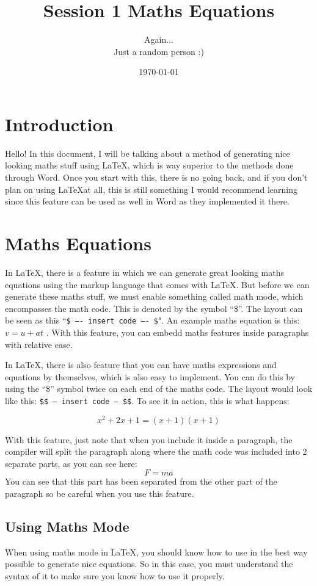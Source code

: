 \documentclass[12pt, a4paper]{article}
\title{Session 1 Maths Equations}
\author{Again... \\ Just a random person :)}
\date{\today}
\begin{document}
	\maketitle

	\section{Introduction}
		Hello! In this document, I will be talking about a method of generating nice looking maths stuff using \LaTeX , which is way superior to the methods done through Word.
		Once you start with this, there is no going back, and if you don't plan on using \LaTeX at all, this is still something I would recommend learning since this feature
		can be used as well in Word as they implemented it there.

	\section{Maths Equations}
		In \LaTeX , there is a feature in which we can generate great looking maths equations using the markup language that comes with \LaTeX .
		But before we can generate these maths stuff, we must enable something called math mode, which encompasses the math code. This is denoted by the symbol ``\$''.
		The layout can be seen as this ``\texttt{\$ ---- insert code ---- \$}". An example maths equation is this: $ v = u + at $ . With this feature, you can
		embedd maths features inside paragraphs with relative ease.

		In \LaTeX , there is also feature that you can have maths expressions and equations by themselves, which is also easy to implement. You can do this
		by using the ``\$'' symbol twice on each end of the maths code. The layout would look like this:
		\texttt{\$\$ -- insert code -- \$\$}. To see it in action, this is what happens:

		$$x^2 + 2x + 1 = (x+1)(x+1)$$

		With this feature, just note that when you include it inside a paragraph, the compiler will split the paragraph along
		where the math code was included into 2 separate parts, as you can see here:
		$$F = ma$$
		You can see that this part has been separated from the other part of the paragraph so be careful when you use this feature.

		\subsection{Using Maths Mode}
			When using maths mode in \LaTeX , you should know how to use in the best way possible to generate nice equations.
			So in this case, you must understand the syntax of it to make sure you know how to use it properly.
\end{document}
